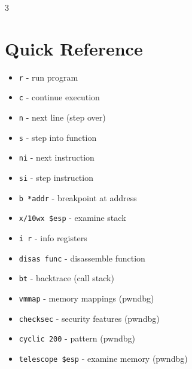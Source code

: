 \documentclass[10pt,landscape,a4paper]{article}
\begin{document}
\begin{multicols}{3}
\section*{Quick Reference}
\begin{itemize}[leftmargin=*,noitemsep,topsep=0pt]
    \item \texttt{r} - run program
    \item \texttt{c} - continue execution
    \item \texttt{n} - next line (step over)
    \item \texttt{s} - step into function
    \item \texttt{ni} - next instruction
    \item \texttt{si} - step instruction
    \item \texttt{b *addr} - breakpoint at address
    \item \texttt{x/10wx \$esp} - examine stack
    \item \texttt{i r} - info registers
    \item \texttt{disas func} - disassemble function
    \item \texttt{bt} - backtrace (call stack)
    \item \texttt{vmmap} - memory mappings (pwndbg)
    \item \texttt{checksec} - security features (pwndbg)
    \item \texttt{cyclic 200} - pattern (pwndbg)
    \item \texttt{telescope \$esp} - examine memory (pwndbg)
\end{itemize}

\vfill
\columnbreak

\end{multicols}
\end{document}
